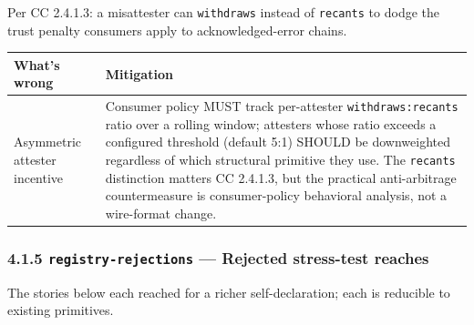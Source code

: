 \documentclass[11pt]{article}
\begin{document}
Per CC 2.4.1.3: a misattester can \texttt{withdraws} instead of \texttt{recants} to dodge the trust penalty consumers apply to acknowledged-error chains.


{\footnotesize
\begin{longtable}{|p{8.0cm}|p{8.0cm}|}\hline
\textbf{What's wrong} & \textbf{Mitigation} \\ \hline\endhead
Asymmetric attester incentive & Consumer policy MUST track per-attester \texttt{withdraws:recants} ratio over a rolling window; attesters whose ratio exceeds a configured threshold (default 5:1) SHOULD be downweighted regardless of which structural primitive they use. The \texttt{recants} distinction matters CC 2.4.1.3, but the practical anti-arbitrage countermeasure is consumer-policy behavioral analysis, not a wire-format change. \\ \hline
\end{longtable}}


\subsubsection*{4.1.5 \texttt{registry-rejections} — Rejected stress-test reaches}


The stories below each reached for a richer self-declaration; each is reducible to existing primitives.
\end{document}
